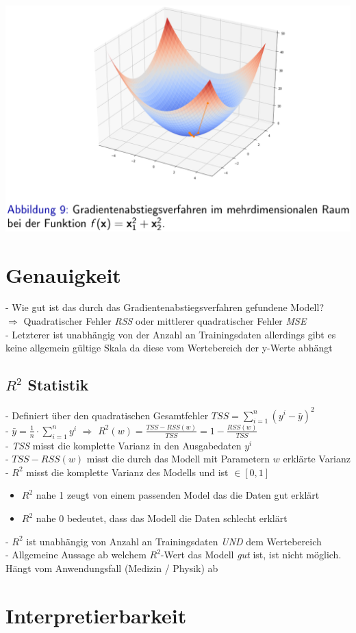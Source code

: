 \documentclass{report}
\begin{document}
\begin{center}
  \includegraphics[scale=.25]{ml02_5}
\end{center}

\section{Genauigkeit}
- Wie gut ist das durch das Gradientenabstiegsverfahren gefundene Modell?\\
$\Rightarrow$ Quadratischer Fehler \textit{RSS} oder mittlerer quadratischer Fehler \textit{MSE}\\
- Letzterer ist unabhängig von der Anzahl an Trainingsdaten allerdings gibt es keine allgemein gültige Skala da diese vom Wertebereich der y-Werte abhängt

\subsection{$R^2$ Statistik}
- Definiert über den quadratischen Gesamtfehler $TSS = \sum_{i=1}^n(y^i - \bar{y})^2$\\
- $\bar{y} = \frac{1}{n}\cdot \sum_{i=1}^ny^i$ $\Rightarrow$ $R^2(w) = \frac{TSS - RSS(w)}{TSS} = 1 - \frac{RSS(w)}{TSS}$\\
- \textit{TSS} misst die komplette Varianz in den Ausgabedaten $y^i$\\
- $TSS - RSS(w)$ misst die durch das Modell mit Parametern $w$ erklärte Varianz\\
- $R^2$ misst die komplette Varianz des Modells und ist $\in [0, 1]$\\
\vspace*{-1.25em}
\begin{itemize}
  \item $R^2$ nahe 1 zeugt von einem passenden Model das die Daten gut erklärt
  \item $R^2$ nahe 0 bedeutet, dass das Modell die Daten schlecht erklärt
\end{itemize}
- $R^2$ ist unabhängig von Anzahl an Trainingsdaten \textit{UND} dem Wertebereich\\
- Allgemeine Aussage ab welchem $R^2$-Wert das Modell \textit{gut} ist, ist nicht möglich. Hängt vom Anwendungsfall (Medizin / Physik) ab

\section{Interpretierbarkeit}
\end{document}
